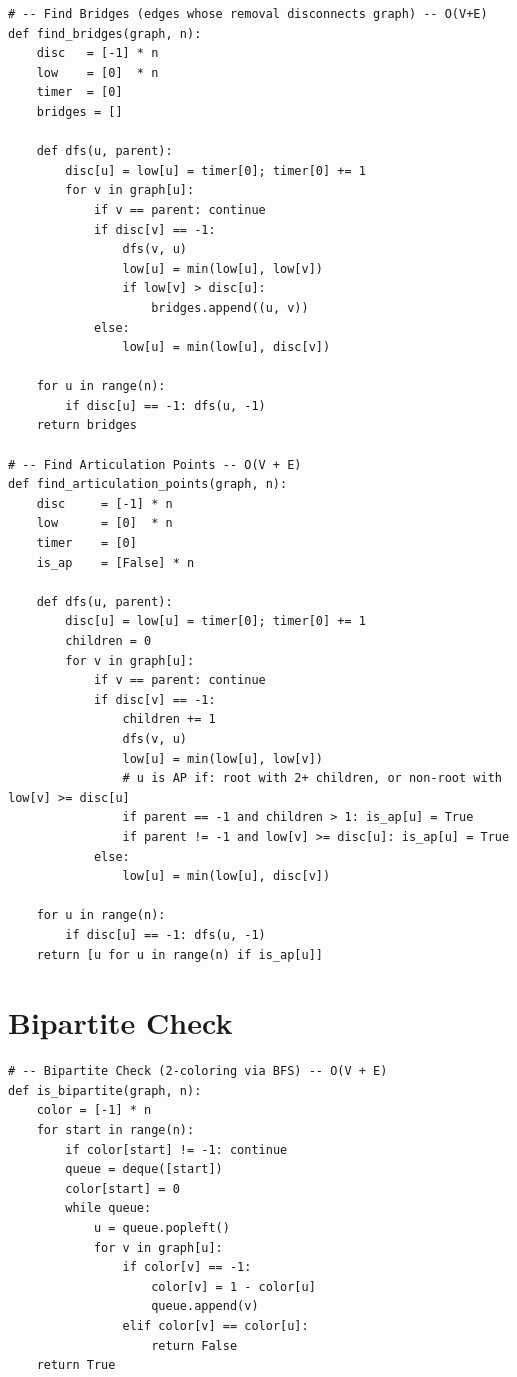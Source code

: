\documentclass[11pt,a4paper]{report}
\begin{document}
\begin{lstlisting}
# -- Find Bridges (edges whose removal disconnects graph) -- O(V+E)
def find_bridges(graph, n):
    disc   = [-1] * n
    low    = [0]  * n
    timer  = [0]
    bridges = []

    def dfs(u, parent):
        disc[u] = low[u] = timer[0]; timer[0] += 1
        for v in graph[u]:
            if v == parent: continue
            if disc[v] == -1:
                dfs(v, u)
                low[u] = min(low[u], low[v])
                if low[v] > disc[u]:
                    bridges.append((u, v))
            else:
                low[u] = min(low[u], disc[v])

    for u in range(n):
        if disc[u] == -1: dfs(u, -1)
    return bridges

# -- Find Articulation Points -- O(V + E)
def find_articulation_points(graph, n):
    disc     = [-1] * n
    low      = [0]  * n
    timer    = [0]
    is_ap    = [False] * n

    def dfs(u, parent):
        disc[u] = low[u] = timer[0]; timer[0] += 1
        children = 0
        for v in graph[u]:
            if v == parent: continue
            if disc[v] == -1:
                children += 1
                dfs(v, u)
                low[u] = min(low[u], low[v])
                # u is AP if: root with 2+ children, or non-root with low[v] >= disc[u]
                if parent == -1 and children > 1: is_ap[u] = True
                if parent != -1 and low[v] >= disc[u]: is_ap[u] = True
            else:
                low[u] = min(low[u], disc[v])

    for u in range(n):
        if disc[u] == -1: dfs(u, -1)
    return [u for u in range(n) if is_ap[u]]
\end{lstlisting}

\section{Bipartite Check}

\begin{lstlisting}
# -- Bipartite Check (2-coloring via BFS) -- O(V + E)
def is_bipartite(graph, n):
    color = [-1] * n
    for start in range(n):
        if color[start] != -1: continue
        queue = deque([start])
        color[start] = 0
        while queue:
            u = queue.popleft()
            for v in graph[u]:
                if color[v] == -1:
                    color[v] = 1 - color[u]
                    queue.append(v)
                elif color[v] == color[u]:
                    return False
    return True
\end{lstlisting}
\end{document}
